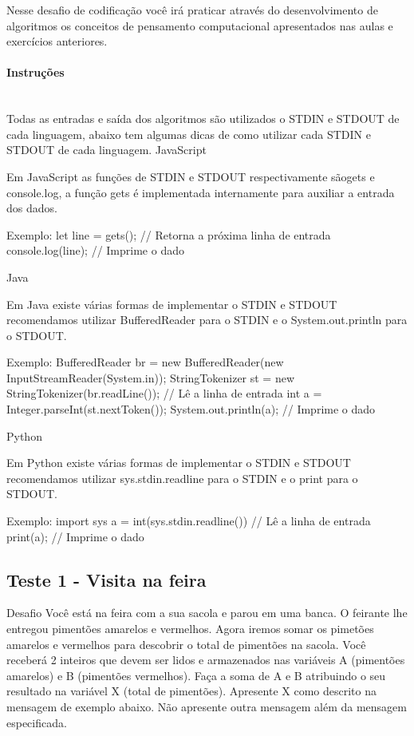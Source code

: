 \documentclass[12pt,a4paper]{article}
\begin{document}
	Nesse desafio de codificação você irá praticar através do desenvolvimento de algoritmos os conceitos de pensamento computacional apresentados nas aulas e exercícios anteriores.
	
	\paragraph{Instruções} \mbox{}\\
	Todas as entradas e saída dos algoritmos são utilizados o STDIN e STDOUT de cada linguagem, abaixo tem algumas dicas de como utilizar cada STDIN e STDOUT de cada linguagem.
	JavaScript
	
	Em JavaScript as funções de STDIN e STDOUT respectivamente sãogets e console.log, a função gets é implementada internamente para auxiliar a entrada dos dados.
	
	Exemplo:
	let line = gets(); // Retorna a próxima linha de entrada
	console.log(line); // Imprime o dado
	
	Java
	
	Em Java existe várias formas de implementar o STDIN e STDOUT recomendamos utilizar BufferedReader para o STDIN e o System.out.println para o STDOUT.
	
	Exemplo:
	BufferedReader br = new BufferedReader(new InputStreamReader(System.in));
	StringTokenizer st = new StringTokenizer(br.readLine()); // Lê a linha de entrada
	int a = Integer.parseInt(st.nextToken());
	System.out.println(a); // Imprime o dado
	
	Python
	
	Em Python existe várias formas de implementar o STDIN e STDOUT recomendamos utilizar sys.stdin.readline para o STDIN e o print para o STDOUT.
	
	Exemplo:
	import sys
	a = int(sys.stdin.readline()) // Lê a linha de entrada
	print(a); // Imprime o dado
	
	\subsection{Teste 1 - Visita na feira}
	Desafio
	Você está na feira com a sua sacola e parou em uma banca. O feirante lhe entregou pimentões amarelos e vermelhos. Agora iremos somar os pimetões amarelos e vermelhos para descobrir o total de pimentões na sacola.  Você receberá 2 inteiros que devem ser lidos e armazenados nas variáveis A (pimentões amarelos) e B (pimentões vermelhos). Faça a soma de A e B atribuindo o seu resultado na variável X (total de pimentões). Apresente X como descrito na mensagem de exemplo abaixo. Não apresente outra mensagem além da mensagem especificada.
	
\end{document}
